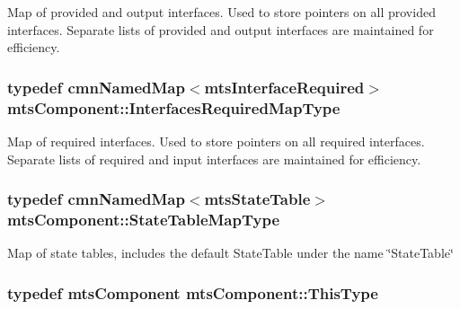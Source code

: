 Map of provided and output interfaces. Used to store pointers on all provided interfaces. Separate lists of provided and output interfaces are maintained for efficiency. \hypertarget{classmts_component_aa3264a5cc739bccecbb58e5095bdd696}{
\subsubsection[{Interfaces\-Required\-Map\-Type}]{\setlength{\rightskip}{0pt plus 5cm}typedef {\bf cmn\-Named\-Map}$<${\bf mts\-Interface\-Required}$>$ {\bf mts\-Component\-::\-Interfaces\-Required\-Map\-Type}\hspace{0.3cm}{\ttfamily [protected]}}}\label{classmts_component_aa3264a5cc739bccecbb58e5095bdd696}
Map of required interfaces. Used to store pointers on all required interfaces. Separate lists of required and input interfaces are maintained for efficiency. \hypertarget{classmts_component_afd25509fe46d10ebc7a53347aa21c4ec}{
\subsubsection[{State\-Table\-Map\-Type}]{\setlength{\rightskip}{0pt plus 5cm}typedef {\bf cmn\-Named\-Map}$<${\bf mts\-State\-Table}$>$ {\bf mts\-Component\-::\-State\-Table\-Map\-Type}\hspace{0.3cm}{\ttfamily [protected]}}}\label{classmts_component_afd25509fe46d10ebc7a53347aa21c4ec}
Map of state tables, includes the default State\-Table under the name \char`\"{}\-State\-Table\char`\"{} \hypertarget{classmts_component_a938b0f369786119d9fa6426a2e3df112}{
\subsubsection[{This\-Type}]{\setlength{\rightskip}{0pt plus 5cm}typedef {\bf mts\-Component} {\bf mts\-Component\-::\-This\-Type}}}\label{classmts_component_a938b0f369786119d9fa6426a2e3df112}


